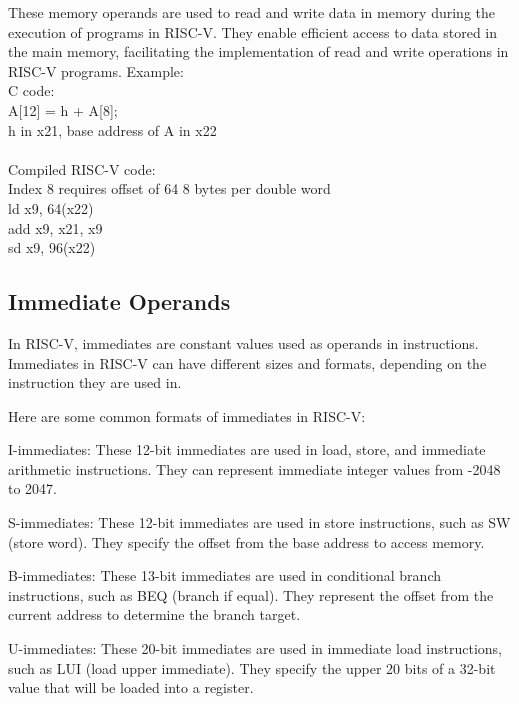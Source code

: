             These memory operands are used to read and write data in memory during the execution of programs in RISC-V. They enable efficient access to data stored in the main memory, facilitating the implementation of read and write operations in RISC-V programs.
            Example: \\
            C code:\\
            A[12] = h + A[8]; \\
            h in x21, base address of A in x22 \\
            \\
            Compiled RISC-V code: \\
            Index 8 requires offset of 64 8 bytes per double word\\
            ld x9, 64(x22)\\
            add x9, x21, x9\\
            sd x9, 96(x22)\\
        
        \subsection{Immediate Operands}
        
            In RISC-V, immediates are constant values used as operands in instructions. Immediates in RISC-V can have different sizes and formats, depending on the instruction they are used in. 
            
            Here are some common formats of immediates in RISC-V:
            
            I-immediates: These 12-bit immediates are used in load, store, and immediate arithmetic instructions. They can represent immediate integer values from -2048 to 2047.
            
            S-immediates: These 12-bit immediates are used in store instructions, such as SW (store word). They specify the offset from the base address to access memory.
            
            B-immediates: These 13-bit immediates are used in conditional branch instructions, such as BEQ (branch if equal). They represent the offset from the current address to determine the branch target.
            
            U-immediates: These 20-bit immediates are used in immediate load instructions, such as LUI (load upper immediate). They specify the upper 20 bits of a 32-bit value that will be loaded into a register.
            
